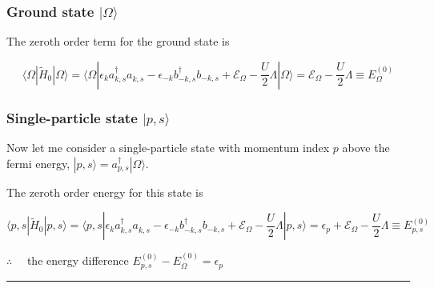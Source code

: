 \documentclass[
  letterpaper,
  DIV=11,
  numbers=noendperiod]{scrartcl}
\begin{document}
\subsubsection{\texorpdfstring{Ground state
\(|\Omega\rangle\)}{Ground state \textbar\textbackslash Omega\textbackslash rangle}}\label{ground-state-omegarangle}

The zeroth order term for the ground state is

\[
\langle \Omega|\tilde H_0|\Omega\rangle=\langle\Omega|\epsilon_{k}a^{\dagger}_{k,s}a^{}_{k,s}-\epsilon_{-k}b^{\dagger}_{-k,s}b^{}_{-k,s}+\mathcal{E}_{\Omega}-\frac{U}{2}\Lambda|\Omega\rangle=\mathcal{E}_{\Omega}-\frac{U}{2}\Lambda\equiv E^{(0)}_\Omega
\]

\subsubsection{\texorpdfstring{Single-particle state
\(|p,s\rangle\)}{Single-particle state \textbar p,s\textbackslash rangle}}\label{single-particle-state-psrangle}

Now let me consider a single-particle state with momentum index \(p\)
above the fermi energy, \(|p,s\rangle=a^\dagger_{p,s}|\Omega\rangle\).

The zeroth order energy for this state is

\[
\langle p,s|\tilde H_0|p,s\rangle=\langle p,s|\epsilon_{k}a^{\dagger}_{k,s}a^{}_{k,s}-\epsilon_{-k}b^{\dagger}_{-k,s}b^{}_{-k,s}+\mathcal{E}_{\Omega}-\frac{U}{2}\Lambda|p,s\rangle=\epsilon_p+\mathcal{E}_{\Omega}-\frac{U}{2}\Lambda\equiv E^{(0)}_{p,s}
\]

\begin{tcolorbox}[enhanced jigsaw, arc=.35mm, bottomrule=.15mm, bottomtitle=1mm, breakable, colback=white, colbacktitle=quarto-callout-note-color!10!white, colframe=quarto-callout-note-color-frame, coltitle=black, left=2mm, leftrule=.75mm, opacityback=0, opacitybacktitle=0.6, rightrule=.15mm, title=\textcolor{quarto-callout-note-color}{\faInfo}\hspace{0.5em}{Energy difference at \(\mathcal{O}(V^0)\)}, titlerule=0mm, toprule=.15mm, toptitle=1mm]

\(\therefore\quad\) the energy difference
\(E^{(0)}_{p,s}-E^{(0)}_\Omega=\epsilon_p\)

\end{tcolorbox}

\begin{center}\rule{0.5\linewidth}{0.5pt}\end{center}
\end{document}
